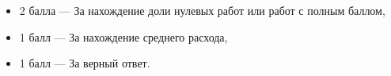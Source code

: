 \begin{itemize}
	\item{2 балла} --- За нахождение доли нулевых работ или работ с полным баллом,
	\item{1 балл} --- За нахождение среднего расхода,
	\item{1 балл} --- За верный ответ.
\end{itemize}